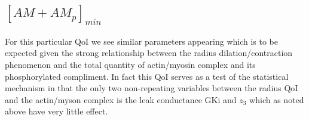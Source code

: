 \subsection{$[AM+AM_p]_{min}$}
For this particular QoI we see similar parameters appearing which is to be expected given the strong relationship between the radius dilation/contraction phenomenon and the total quantity of actin/myosin complex and its phosphorylated compliment. In fact this QoI serves as a test of the statistical mechanism in that the only two non-repeating variables between the radius QoI and the actin/myson complex is the leak conductance GKi and $z_3$ which as noted above have very little effect. 
